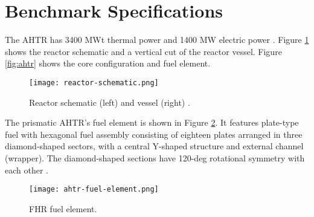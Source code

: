 \section{Benchmark Specifications}
The \gls{AHTR} has 3400 MWt thermal power and 1400 MW electric power 
\cite{varma_ahtr_2012}. 
Figure \ref{fig:reactor-schematic} shows the reactor schematic and a vertical 
cut of the reactor vessel. 
Figure \ref{fig:ahtr} shows the core configuration and fuel element. 
\begin{figure}[]
    \centering
    \texttt{[image: reactor-schematic.png]} 
    \caption{Reactor schematic (left) and vessel (right) 
    \cite{noauthor_fluoride_nodate}.}
    \label{fig:reactor-schematic}
\end{figure}
The prismatic \gls{AHTR}'s fuel element is shown in Figure 
\ref{fig:ahtr-fuel-element}.  
It features plate-type fuel with hexagonal fuel assembly consisting of eighteen 
plates arranged in three diamond-shaped sectors, with a central Y-shaped 
structure and external channel (wrapper).
The diamond-shaped sections have 120-deg rotational symmetry with each other 
\cite{varma_ahtr_2012,ramey_monte_2018,noauthor_fluoride_nodate}. 
\begin{figure}[]
    \centering
    \texttt{[image: ahtr-fuel-element.png]} 
    \caption{FHR fuel element.}
    \label{fig:ahtr-fuel-element}
\end{figure}

